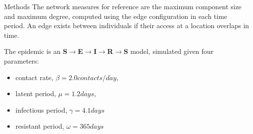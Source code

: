 \documentclass[final]{beamer} %
\newenvironment{oneCol}{\begin{column}[t]{0.225\paperwidth}}{\end{column}}
\begin{document}
\begin{frame}{}
\begin{columns}[t]
\begin{oneCol}
\begin{block}{Methods}
The network measures for reference are the maximum component size and maximum degree, computed using the edge configuration in each time period.  An edge exists between individuals if their access at a location overlaps in time.

The epidemic is an \textbf{S$\rightarrow$E$\rightarrow$I$\rightarrow$R$\rightarrow$S} model, simulated given four parameters:\begin{itemize}
\item contact rate, $\beta = 2.0 contacts/day$,
\item latent period, $\mu = 1.2 days$,
\item infectious period, $\gamma = 4.1 days$
\item resistant period, $\omega = 365 days$
\end{itemize}


\end{block}
\end{oneCol}
\end{columns}
\end{frame}
\end{document}
